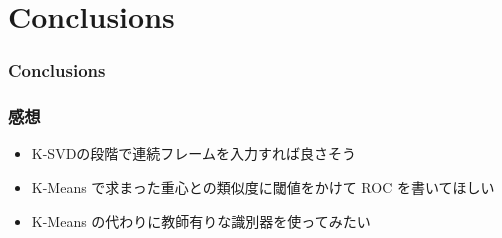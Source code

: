 \section{Conclusions}


\begin{frame}\frametitle{Conclusions}
\end{frame}


\begin{frame}\frametitle{感想}
\begin{itemize}
  \item K-SVDの段階で連続フレームを入力すれば良さそう
  \item K-Means で求まった重心との類似度に閾値をかけて ROC を書いてほしい
  \item K-Means の代わりに教師有りな識別器を使ってみたい
\end{itemize}
\end{frame}
